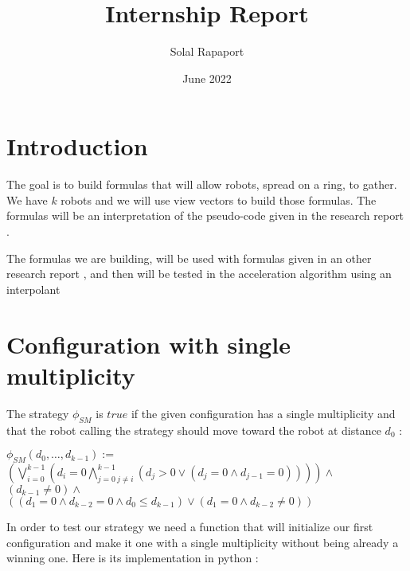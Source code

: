 \documentclass{article}
\title{Internship Report}
\author{Solal Rapaport }
\date{June 2022}
\begin{document}
\maketitle

\section{Introduction}

The goal is to build formulas that will allow robots, spread on a ring, to gather. We have $k$ robots and we will use view vectors to build those formulas. The formulas will be an interpretation of the pseudo-code given in the research report \cite{gathering}.

The formulas we are building, will be used with formulas given in an other research report \cite{algo}, and then will be tested in the acceleration algorithm using an interpolant \cite{algo}

\section{Configuration with single multiplicity}

The strategy $\phi_{SM}$ is $true$ if the given configuration has a single multiplicity and that the robot calling the strategy should move toward the robot at distance $d_{0}$ :
\begin{center}
$\phi_{SM}(d_0, \ldots , d_{k-1}):=$\\
$(\bigvee_{i=0}^{k-1}(d_i = 0\bigwedge_{j=0\ j\not=i}^{k-1} (d_j > 0 \lor (d_j = 0 \land d_{j-1} = 0) ) ))\land$\\
$(d_{k-1} \not= 0) \land $\\
$((d_1 = 0 \land d_{k-2} = 0 \land d_0 \leq d_{k-1}) \lor (d_1 = 0 \land d_{k-2} \not= 0))$
\end{center}

In order to test our strategy we need a function that will initialize our first configuration and make it one with a single multiplicity without being already a winning one. Here is its implementation in python :
\end{document}
